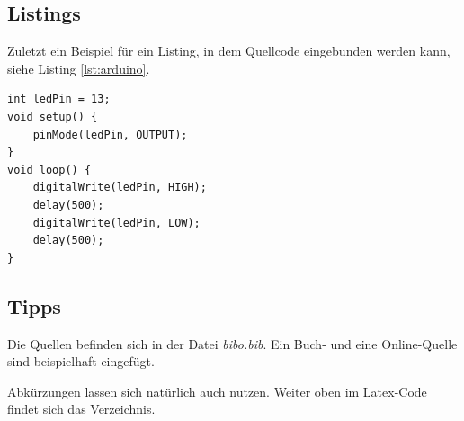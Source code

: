 \documentclass[12pt,a4paper,bibliography=totocnumbered,listof=totoc]{scrartcl}
\begin{document}
\subsection{Listings}
Zuletzt ein Beispiel für ein Listing, in dem Quellcode eingebunden werden kann, siehe Listing \ref{lst:arduino}.

\vspace{1em}
\begin{lstlisting}[caption=Arduino Beispielprogramm, label=lst:arduino]
int ledPin = 13;
void setup() {
    pinMode(ledPin, OUTPUT);
}
void loop() {
    digitalWrite(ledPin, HIGH);
    delay(500);
    digitalWrite(ledPin, LOW);
    delay(500);
}
\end{lstlisting}

\subsection{Tipps}
Die Quellen befinden sich in der Datei \textit{bibo.bib}. Ein Buch- und eine Online-Quelle sind beispielhaft eingefügt.

Abkürzungen lassen sich natürlich auch nutzen. Weiter oben im Latex-Code findet sich das Verzeichnis.
\pagebreak






\end{document}

